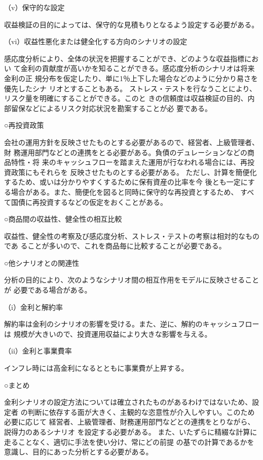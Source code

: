 \documentclass[report,gutter=10mm,fore-edge=10mm,uplatex,dvipdfmx]{jlreq}
\begin{document}
（v）保守的な設定

収益検証の目的によっては、保守的な見積もりとなるよう設定する必要がある。

（vi）収益性悪化または健全化する方向のシナリオの設定

感応度分析により、全体の状況を把握することができ、どのような収益指標におい
て金利の貢献度が高いかを知ることができる。感応度分析のシナリオは将来金利の正
規分布を仮定したり、単に1％上下した場合などのように分かり易さを優先したシナ
リオとすることもある。
ストレス・テストを行なうことにより、リスク量を明確にすることができる。このと
きの信頼度は収益検証の目的、内部留保などによるリスク対応状況を勘案することが必
要である。

○再投資政策

会社の運用方針を反映させたものとする必要があるので、経営者、上級管理者、財
務運用部門などとの連携をとる必要がある。負債のデュレーションなどの商品特性・将
来のキャッシュフローを踏まえた運用が行なわれる場合には、再投資政策にもそれらを
反映させたものとする必要がある。
ただし、計算を簡便化するため、或いは分かりやすくするために保有資産の比率を今
後とも一定にする場合がある。また、簡便化を図ると同時に保守的な再投資とするため、
すべて国債に再投資するなどの仮定をおくことがある。

○商品間の収益性、健全性の相互比較

収益性、健全性の考察及び感応度分析、ストレス・テストの考察は相対的なものであ
ることが多いので、これを商品毎に比較することが必要である。

○他シナリオとの関連性

分析の目的により、次のようなシナリオ間の相互作用をモデルに反映させることが
必要である場合がある。

（i）金利と解約率

解約率は金利のシナリオの影響を受ける。また、逆に、解約のキャッシュフローは
規模が大きいので、投資運用収益により大きな影響を与える。

（ii）金利と事業費率

インフレ時には高金利になるとともに事業費が上昇する。

○まとめ

金利シナリオの設定方法については確立されたものがあるわけではないため、設定者
の判断に依存する面が大きく、主観的な恣意性が介入しやすい。このため必要に応じて
経営者、上級管理者、財務運用部門などとの連携をとりながら、説得力のあるシナリオ
を設定する必要がある。
また、いたずらに精綴な計算に走ることなく、適切に手法を使い分け、常にどの前提
の基での計算であるかを意識し、目的にあった分析とする必要がある。
\end{document}
